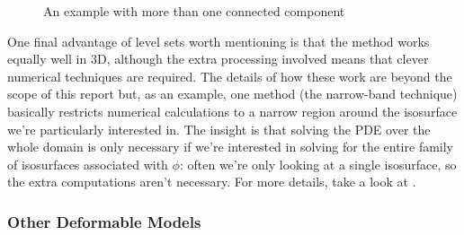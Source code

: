 \begin{figure}[H]
\begin{center}
	\hspace{4mm}%
\end{center}
\caption{An example with more than one connected component}
\label{fig:levelsets-discrete2}
\end{figure}

One final advantage of level sets worth mentioning is that the method works equally well in 3D, although the extra processing involved means that clever numerical techniques are required. The details of how these work are beyond the scope of this report but, as an example, one method (the narrow-band technique) basically restricts numerical calculations to a narrow region around the isosurface we're particularly interested in. The insight is that solving the PDE over the whole domain is only necessary if we're interested in solving for the entire family of isosurfaces associated with $\phi$: often we're only looking at a single isosurface, so the extra computations aren't necessary. For more details, take a look at \cite{yoo04}.

\subsubsection{Other Deformable Models}



